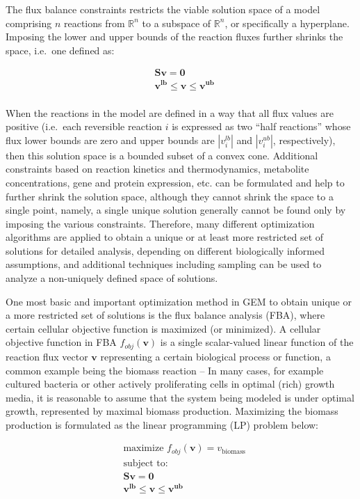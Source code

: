 \documentclass[12pt,twoside,openany,\mydriver]{thesis}  %
\begin{document}
The flux balance constraints restricts the viable solution space of a model comprising \(n\) reactions from \(\mathbb R^n\) to a subspace of \(\mathbb R^n\), or specifically a hyperplane. Imposing the lower and upper bounds of the reaction fluxes further shrinks the space, i.e.~one defined as:

\[
\begin{aligned}
&\mathbf{Sv = 0} \\
&\mathbf{v^{lb} \le v \le v^{ub}} \\
\end{aligned}
\]

When the reactions in the model are defined in a way that all flux values are positive (i.e.~each reversible reaction \(i\) is expressed as two ``half reactions'' whose flux lower bounds are zero and upper bounds are \(|v^{lb}_i|\) and \(|v^{ub}_i|\), respectively), then this solution space is a bounded subset of a convex cone. Additional constraints based on reaction kinetics and thermodynamics, metabolite concentrations, gene and protein expression, etc. can be formulated and help to further shrink the solution space, although they cannot shrink the space to a single point, namely, a single unique solution generally cannot be found only by imposing the various constraints. Therefore, many different optimization algorithms are applied to obtain a unique or at least more restricted set of solutions for detailed analysis, depending on different biologically informed assumptions, and additional techniques including sampling can be used to analyze a non-uniquely defined space of solutions.

One most basic and important optimization method in GEM to obtain unique or a more restricted set of solutions is the flux balance analysis (FBA), where certain cellular objective function is maximized (or minimized). A cellular objective function in FBA \(f_{obj}(\mathbf{v})\) is a single scalar-valued linear function of the reaction flux vector \(\mathbf{v}\) representing a certain biological process or function, a common example being the biomass reaction -- In many cases, for example cultured bacteria or other actively proliferating cells in optimal (rich) growth media, it is reasonable to assume that the system being modeled is under optimal growth, represented by maximal biomass production. Maximizing the biomass production is formulated as the linear programming (LP) problem below:

\[
\begin{aligned}
&\text{maximize } f_{obj}(\mathbf{v}) = v_{\text{biomass}} \\
&\text{subject to:} \\
&\mathbf{Sv = 0} \\
&\mathbf{v^{lb} \le v \le v^{ub}} \\
\end{aligned}
\]
\end{document}

